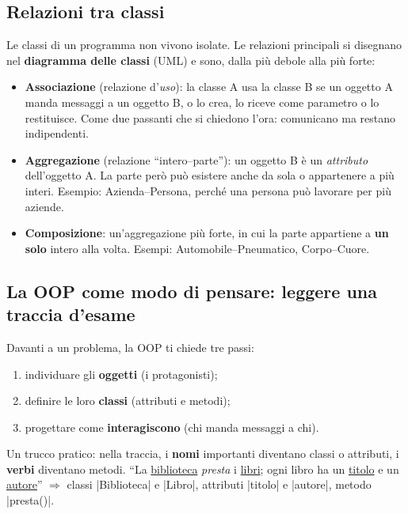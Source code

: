 \subsection*{Relazioni tra classi}

Le classi di un programma non vivono isolate. Le relazioni principali si
disegnano nel \textbf{diagramma delle classi} (UML) e sono, dalla più debole
alla più forte:
\begin{itemize}
  \item \textbf{Associazione} (relazione d'\emph{uso}): la classe A usa la classe
        B se un oggetto A manda messaggi a un oggetto B, o lo crea, lo riceve come
        parametro o lo restituisce. Come due passanti che si chiedono l'ora:
        comunicano ma restano indipendenti.
  \item \textbf{Aggregazione} (relazione ``intero--parte''): un oggetto B è un
        \emph{attributo} dell'oggetto A. La parte però può esistere anche da sola
        o appartenere a più interi. Esempio: Azienda--Persona, perché una persona
        può lavorare per più aziende.
  \item \textbf{Composizione}: un'aggregazione più forte, in cui la parte
        appartiene a \textbf{un solo} intero alla volta. Esempi:
        Automobile--Pneumatico, Corpo--Cuore.
\end{itemize}

\subsection*{La OOP come modo di pensare: leggere una traccia d'esame}

Davanti a un problema, la OOP ti chiede tre passi:
\begin{enumerate}
  \item individuare gli \textbf{oggetti} (i protagonisti);
  \item definire le loro \textbf{classi} (attributi e metodi);
  \item progettare come \textbf{interagiscono} (chi manda messaggi a chi).
\end{enumerate}
Un trucco pratico: nella traccia, i \textbf{nomi} importanti diventano classi o
attributi, i \textbf{verbi} diventano metodi. ``La \underline{biblioteca}
\emph{presta} i \underline{libri}; ogni libro ha un \underline{titolo} e un
\underline{autore}'' $\Rightarrow$ classi \cc|Biblioteca| e \cc|Libro|, attributi
\cc|titolo| e \cc|autore|, metodo \cc|presta()|.

